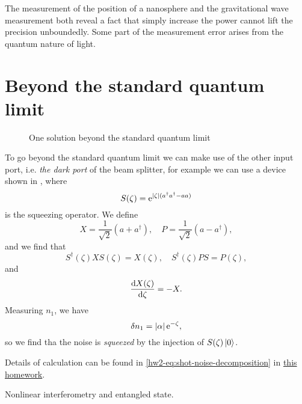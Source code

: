 \documentclass[hyperref, a4paper]{article}
\newcommand*{\ee}{\mathrm{e}}
\begin{document}
The measurement of the position of a nanosphere and the gravitational wave measurement both reveal a fact that simply increase the power cannot lift the precision unboundedly. 
Some part of the measurement error arises from the quantum nature of light.

\section{Beyond the standard quantum limit}

\begin{figure}
    \centering
    
    \caption{One solution beyond the standard quantum limit}
    \label{fig:beyond-sql}
\end{figure}

To go beyond the standard quantum limit we can make use of the other input port, i.e. \emph{the dark port} of the beam splitter, for example we can use a device shown in , where 
\begin{equation}
    S(\zeta) = \ee^{\abs*{\zeta} (a^\dagger a^\dagger - a a)}
\end{equation}
is the squeezing operator. We define
\begin{equation}
    X = \frac{1}{\sqrt{2}} (a + a^\dagger), \quad P = \frac{1}{\sqrt{2}} (a - a^\dagger),
\end{equation}
and we find that 
\begin{equation}
    S^\dagger(\zeta) X S(\zeta) = X(\zeta) , \quad S^\dagger(\zeta) P S = P(\zeta), 
\end{equation}
and 
\begin{equation}
    \dv{X(\zeta)}{\zeta} = - X.
\end{equation}
Measuring $n_1$, we have 
\begin{equation}
    \var{n}_1 = \abs*{\alpha} \ee^{-\zeta}, 
\end{equation}
so we find tha the noise is \emph{squeezed} by the injection of $S(\zeta) \ket*{0}$.

Details of calculation can be found in \eqref{hw2-eq:shot-noise-decomposition} in \href{../quantum-optics-homework/2/2-discussion.pdf}{this homework}.

Nonlinear interferometry and entangled state.
\end{document}

